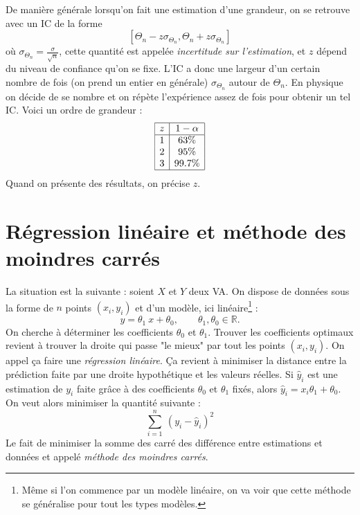 \documentclass[a4paper,12pt]{report}
\theoremstyle{definition}
\newcommand{\R}{\mathbb{R}}
\renewcommand{\(}{\left(}
\renewcommand{\)}{\right)}
\renewcommand{\d}{\textit}
\begin{document}
        De manière générale lorsqu'on fait une estimation d'une grandeur, on se retrouve avec un IC de la forme
        $$[ \Theta_n-z\sigma_{\Theta_n},\Theta_n+z\sigma_{\Theta_n}]$$
        où $\sigma_{\Theta_n} = \frac{\sigma}{\sqrt{n}}$, cette quantité est appelée \d{incertitude sur l'estimation}, et $z$ dépend du niveau de confiance qu'on se fixe. L'IC a donc une largeur d'un certain nombre de fois (on prend un entier en générale) $\sigma_{\Theta_n}$ autour de $\Theta_n$. En physique on décide de se nombre et on répète l'expérience assez de fois pour obtenir un tel IC. Voici un ordre de grandeur :
        $$
        \begin{array}{|c|c|}
            \hline
            z & 1-\alpha \\
            \hline
            1 & 63\% \\
            2 & 95\% \\
            3 & 99.7\% \\
            \hline
        \end{array}
        $$
        Quand on présente des résultats, on précise $z$.
        
    \section{Régression linéaire et méthode des moindres carrés}
    
        La situation est la suivante : soient $X$ et $Y$ deux VA. On dispose de données sous la forme de $n$ points $(x_i,y_i)$ et d'un modèle, ici linéaire\footnote{Même si l'on commence par un modèle linéaire, on va voir que cette méthode se généralise pour tout les types modèles.} :
        $$y = \theta_1~x+\theta_0, \qquad \theta_1,\theta_0\in\R.$$
        On cherche à déterminer les coefficients $\theta_0$ et $\theta_1$. Trouver les coefficients optimaux revient à trouver la droite qui passe "le mieux" par tout les points $(x_i,y_i)$. On appel ça faire une \d{régression linéaire}. Ça revient à minimiser la distance entre la prédiction faite par une droite hypothétique et les valeurs réelles. Si $\hat{y}_i$ est une estimation de $y_i$ faite grâce à des coefficients $\theta_0$ et $\theta_1$ fixés, alors $\hat{y}_i = x_i\theta_1+\theta_0$. On veut alors minimiser la quantité suivante :
        \begin{equation}
            \sum_{i=1}^n~(y_i-\hat{y}_i)^2 
            \label{eqtmmc}
        \end{equation}
        Le fait de minimiser la somme des carré des différence entre estimations et données et appelé \d{méthode des moindres carrés}.
        
\end{document}
